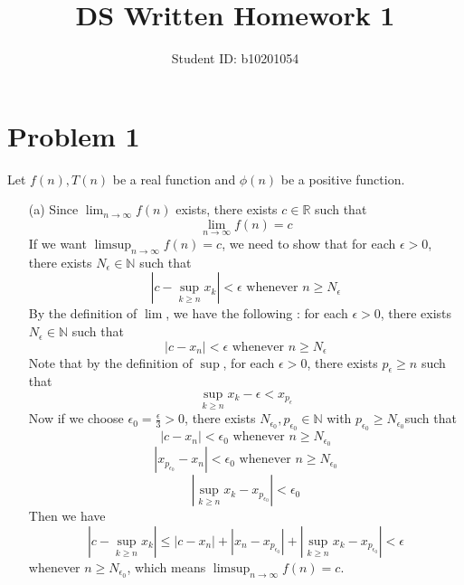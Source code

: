 \documentclass[12pt,a4paper]{article}
\title{DS Written Homework 1}
\author{Student ID: b10201054}
\begin{document}
\maketitle

\section*{Problem 1}
Let $f(n), T(n)$ be a real function and $\phi(n)$ be a positive function.

\begin{enumerate}
    \item [(a)] 
        Since $\lim_{n\to\infty}f(n)$ exists, there exists $c\in \mathbb{R}$ such that 
        \[
            \lim_{n\to\infty}f(n) = c
        \]
        If we want $\limsup_{n\to\infty}f(n) = c$, we need to show that for each $\epsilon > 0$, there exists $N_{\epsilon} \in \mathbb{N}$ such that
        \[
            \left\lvert c - \sup_{k\geq n}x_k \right\rvert  < \epsilon \text{ whenever } n \geq N_{\epsilon}
        \]
        By the definition of $\lim$, we have the following : for each $\epsilon > 0$, there exists $N_{\epsilon} \in \mathbb{N}$ such that
        \[
            \left\lvert c - x_n \right\rvert < \epsilon \text{ whenever } n \geq N_{\epsilon}
        \]
        Note that by the definition of $\sup$, for each $\epsilon > 0$, there exists $p_\epsilon \geq n$ such that
        \[
            \sup_{k \geq n}x_k - \epsilon < x_{p_\epsilon}
        \]
        Now if we choose $\epsilon_0 = \frac{\epsilon}{3} > 0$, there exists $N_{\epsilon_0}, p_{\epsilon_0} \in \mathbb{N}$ with $p_{\epsilon_0} \geq N_{\epsilon_0}$such that
        \[
            \left\lvert c - x_n \right\rvert < \epsilon_0 \text{ whenever } n \geq N_{\epsilon_0}
        \]
        \[
            \left\lvert x_{p_{\epsilon_0}} - x_n \right\rvert < \epsilon_0 \text{ whenever } n \geq N_{\epsilon_0}
        \]
        \[
            \left\lvert \sup_{k \geq n}x_k - x_{p_{\epsilon_0}}\right\rvert  < \epsilon_0
        \]
        Then we have
        \[
            \left\lvert c - \sup_{k\geq n}x_k \right\rvert \leq \left\lvert c - x_n \right\rvert + \left\lvert x_n - x_{p_{\epsilon_0}} \right\rvert + \left\lvert \sup_{k \geq n}x_k - x_{p_{\epsilon_0}}\right\rvert < \epsilon
        \]
        whenever $n \geq N_{\epsilon_0}$, which means $\limsup_{n\to\infty}f(n) = c$.


\end{enumerate}
\end{document}

